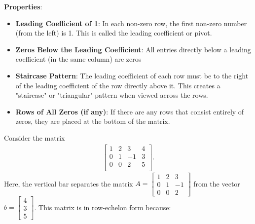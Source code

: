 \documentclass{report}
\begin{document}
\begin{itemize}
                \bigbreak \noindent 
                \textbf{Properties}:
                \begin{itemize}
                    \item \textbf{Leading Coefficient of 1}: In each non-zero row, the first non-zero number (from the left) is 1. This is called the leading coefficient or pivot.
                    \item \textbf{Zeros Below the Leading Coefficient}: All entries directly below a leading coefficient (in the same column) are zeros
                    \item \textbf{Staircase Pattern}: The leading coefficient of each row must be to the right of the leading coefficient of the row directly above it. This creates a "staircase" or "triangular" pattern when viewed across the rows.
                    \item \textbf{Rows of All Zeros (if any)}: If there are any rows that consist entirely of zeros, they are placed at the bottom of the matrix.
                \end{itemize}
                \bigbreak \noindent 
                Consider the matrix
                \begin{align*}
                    \left[\begin{array}{ccc|c}
                            1 & 2 & 3 & 4 \\
                            0 & 1 & -1 & 3 \\
                            0 & 0 & 2 & 5 \\
                    \end{array}\right]
                .\end{align*}
                \bigbreak \noindent 
                Here, the vertical bar separates the matrix $A = \begin{bmatrix}
                    1 & 2 & 3 \\
                    0 & 1 & -1 \\
                    0 & 0 & 2
                \end{bmatrix}$
                \bigbreak \noindent 
                from the vector $b = \begin{bmatrix}
                    4 \\
                    3 \\
                    5
                \end{bmatrix}$.
                \bigbreak \noindent 
                This matrix is in row-echelon form because:

\end{itemize}
\end{document}

